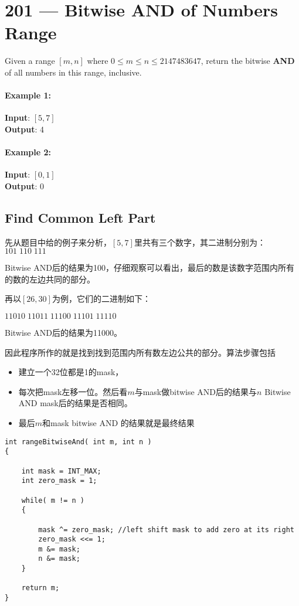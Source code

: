 \section{201 --- Bitwise AND of Numbers Range}
Given a range $[m, n]$ where $0 \leq m \leq n \leq 2147483647$, return the bitwise \textbf{AND} of all numbers in this range, inclusive.
\paragraph{Example 1:}
\begin{flushleft}
\textbf{Input}: $[5,7]$
\\
\textbf{Output}: 4
\end{flushleft}
\paragraph{Example 2:}
\begin{flushleft}
\textbf{Input}: $[0,1]$
\\
\textbf{Output}: 0
\end{flushleft}
\subsection{Find Common Left Part}
\begin{CJK*}{UTF8}{gbsn}
先从题目中给的例子来分析，$[5, 7]$里共有三个数字，其二进制分别为：
$101\;110\;111$
\par
Bitwise AND后的结果为100，仔细观察可以看出，最后的数是该数字范围内所有的数的左边共同的部分。
\par
再以$[26, 30]$为例，它们的二进制如下：
\par
$11010\;11011\;11100\;11101\;11110$
\par
Bitwise AND后的结果为11000。
\par
因此程序所作的就是找到找到范围内所有数左边公共的部分。算法步骤包括
\begin{itemize}
\item 建立一个32位都是1的mask，
\item 每次把mask左移一位。然后看$m$与mask做bitwise AND后的结果与$n$ Bitwise AND mask后的结果是否相同。
\item 最后$m$和mask bitwise AND 的结果就是最终结果
\end{itemize}
\end{CJK*}
\setcounter{lstlisting}{0}
\begin{lstlisting}[style=customc, caption={Find Common Left Bits}]
int rangeBitwiseAnd( int m, int n )
{

    int mask = INT_MAX;
    int zero_mask = 1;

    while( m != n )
    {
		
        mask ^= zero_mask; //left shift mask to add zero at its right
        zero_mask <<= 1;
        m &= mask;
        n &= mask;
    }

    return m;
}
\end{lstlisting}
